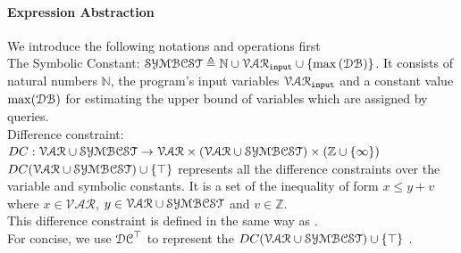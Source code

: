 \paragraph*{Expression Abstraction}
We introduce the following notations and operations first
\\
The Symbolic Constant:  $\mathcal{SYMBCST} \triangleq \mathbb{N} \cup \mathcal{VAR}_{\mathtt{input}} \cup \{\max{(\mathcal{DB})}\} $.
It consists of 
natural numbers $\mathbb{N}$,
the program's input variables $\mathcal{VAR}_{\mathtt{input}}$ 
and a constant value $\max(\mathcal{DB})$ for estimating the upper bound of variables which are
assigned by queries.
\\
Difference constraint: $DC : \mathcal{VAR} \cup \mathcal{SYMBCST} \to \mathcal{\mathcal{VAR} \times (\mathcal{VAR} \cup \mathcal{SYMBCST}) } \times (\mathbb{Z} \cup \{\infty\})$
 \\
$DC(\mathcal{VAR}  \cup \mathcal{SYMBCST}) \cup \{\top\}$ represents all the difference constraints over the 
variable and symbolic constants.
It is a set of the inequality of form $x \leq y + v$ where $x \in \mathcal{VAR} $, 
$y \in \mathcal{VAR}  \cup \mathcal{SYMBCST}$ and $v \in \mathbb{Z}$. 
\\
This difference constraint is defined in the same way as
\cite{sinn2017complexity}. 
\\
For concise, we use $\mathcal{DC}^{\top}$ to represent the $DC(\mathcal{VAR}  \cup \mathcal{SYMBCST}) \cup \{\top\}$ .
\\
